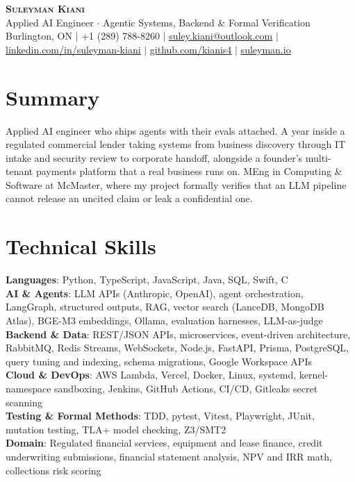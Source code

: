 \documentclass[letterpaper,11pt]{article}
\begin{document}
\begin{center}
    \textbf{\Huge \scshape Suleyman Kiani} \\ \vspace{3pt}
    \small Applied AI Engineer $\cdot$ Agentic Systems, Backend \& Formal Verification \\ \vspace{3pt}
    \footnotesize Burlington, ON $|$ +1 (289) 788-8260 $|$ \href{mailto:suley.kiani@outlook.com}{\underline{suley.kiani@outlook.com}} $|$ \href{https://www.linkedin.com/in/suleyman-kiani}{\underline{linkedin.com/in/suleyman-kiani}} $|$ \href{https://github.com/kianis4}{\underline{github.com/kianis4}} $|$ \href{https://suleyman.io}{\underline{suleyman.io}}
\end{center}

\section{Summary}
\vspace{2pt}
\small{Applied AI engineer who ships agents with their evals attached. A year inside a regulated commercial lender taking systems from business discovery through IT intake and security review to corporate handoff, alongside a founder's multi-tenant payments platform that a real business runs on. MEng in Computing \& Software at McMaster, where my project formally verifies that an LLM pipeline cannot release an uncited claim or leak a confidential one.}
\vspace{-4pt}

\section{Technical Skills}
\begin{itemize}[leftmargin=0.15in, label={}]
    \small{\item{
     \textbf{Languages}{: Python, TypeScript, JavaScript, Java, SQL, Swift, C} \\
     \textbf{AI \& Agents}{: LLM APIs (Anthropic, OpenAI), agent orchestration, LangGraph, structured outputs, RAG, vector search (LanceDB, MongoDB Atlas), BGE-M3 embeddings, Ollama, evaluation harnesses, LLM-as-judge} \\
     \textbf{Backend \& Data}{: REST/JSON APIs, microservices, event-driven architecture, RabbitMQ, Redis Streams, WebSockets, Node.js, FastAPI, Prisma, PostgreSQL, query tuning and indexing, schema migrations, Google Workspace APIs} \\
     \textbf{Cloud \& DevOps}{: AWS Lambda, Vercel, Docker, Linux, systemd, kernel-namespace sandboxing, Jenkins, GitHub Actions, CI/CD, Gitleaks secret scanning} \\
     \textbf{Testing \& Formal Methods}{: TDD, pytest, Vitest, Playwright, JUnit, mutation testing, TLA+ model checking, Z3/SMT2} \\
     \textbf{Domain}{: Regulated financial services, equipment and lease finance, credit underwriting submissions, financial statement analysis, NPV and IRR math, collections risk scoring}
    }}
\end{itemize}
\end{document}
